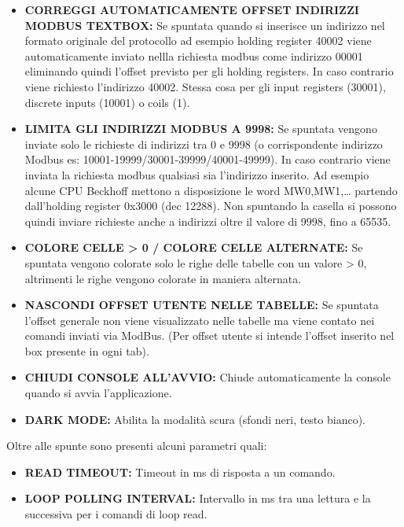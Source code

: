 \begin{itemize}
    \item \textbf{CORREGGI AUTOMATICAMENTE OFFSET INDIRIZZI MODBUS TEXTBOX:}
    Se spuntata quando si inserisce un indirizzo nel formato originale del protocollo ad esempio
    holding register 40002 viene automaticamente inviato nellla richiesta modbus come indirizzo
    00001 eliminando quindi l'offset previsto per gli holding registers. In caso contrario viene 
    richiesto
    l'indirizzo 40002. Stessa cosa per gli input registers (30001), discrete inputs (10001)
    o coils (1).
    \item \textbf{LIMITA GLI INDIRIZZI MODBUS A 9998:}
    Se spuntata vengono inviate solo le richieste di indirizzi tra 0 e 9998 (o corrispondente indirizzo
    Modbus es: 10001-19999/30001-39999/40001-49999). In caso contrario viene inviata la richiesta
    modbus qualsiasi sia l'indirizzo inserito. Ad esempio alcune CPU Beckhoff mettono a disposizione
    le word MW0,MW1,… partendo dall'holding register 0x3000 (dec 12288). Non spuntando la casella
    si possono quindi inviare richieste anche a indirizzi oltre il valore di 9998, fino a 65535.
    \item \textbf{COLORE CELLE > 0 / COLORE CELLE ALTERNATE:}
    Se spuntata vengono colorate solo le righe delle tabelle con un valore > 0, altrimenti le righe
    vengono colorate in maniera alternata.
    \item \textbf{NASCONDI OFFSET UTENTE NELLE TABELLE:}
    Se spuntata l'offset generale non viene visualizzato nelle tabelle ma viene contato nei comandi
    inviati via ModBus. (Per offset utente si intende l'offset inserito nel box presente
    in ogni tab).
    \item \textbf{CHIUDI CONSOLE ALL'AVVIO:}
    Chiude automaticamente la console quando si avvia l'applicazione.
    \item \textbf{DARK MODE:}
    Abilita la modalità scura (sfondi neri, testo bianco).
\end{itemize}

Oltre alle spunte sono presenti alcuni parametri quali:

\begin{itemize}
    \item \textbf{READ TIMEOUT:}
    Timeout in ms di risposta a un comando.
    \item \textbf{LOOP POLLING INTERVAL:}
    Intervallo in ms tra una lettura e la successiva per i comandi di loop read.
\end{itemize}

